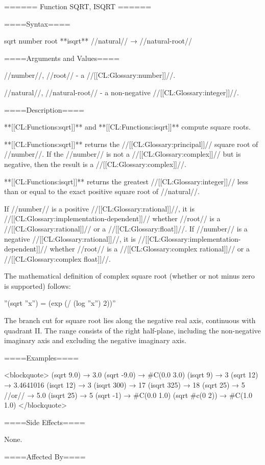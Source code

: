 ====== Function SQRT, ISQRT ======

====Syntax====

\DefunWithValues sqrt {number} {root} **isqrt** //natural// → //natural-root//

====Arguments and Values====

//number//, //root// - a //[[CL:Glossary:number]]//.

//natural//, //natural-root// - a non-negative //[[CL:Glossary:integer]]//.

====Description====

**[[CL:Functions:sqrt]]** and **[[CL:Functions:isqrt]]** compute square roots.

**[[CL:Functions:sqrt]]** returns the //[[CL:Glossary:principal]]// square root of //number//. If the //number// is not a //[[CL:Glossary:complex]]// but is negative, then the result is a //[[CL:Glossary:complex]]//.

**[[CL:Functions:isqrt]]** returns the greatest //[[CL:Glossary:integer]]// less than or equal to the exact positive square root of //natural//.

If //number// is a positive //[[CL:Glossary:rational]]//, it is //[[CL:Glossary:implementation-dependent]]// whether //root// is a //[[CL:Glossary:rational]]// or a //[[CL:Glossary:float]]//. If //number// is a negative //[[CL:Glossary:rational]]//, it is //[[CL:Glossary:implementation-dependent]]// whether //root// is a //[[CL:Glossary:complex rational]]// or a //[[CL:Glossary:complex float]]//.

The mathematical definition of complex square root (whether or not minus zero is supported) follows:

''(sqrt ''x'') = (exp (/ (log ''x'') 2))''

The branch cut for square root lies along the negative real axis, continuous with quadrant II. The range consists of the right half-plane, including the non-negative imaginary axis and excluding the negative imaginary axis.

====Examples====

<blockquote> (sqrt 9.0) → 3.0 (sqrt -9.0) → #C(0.0 3.0) (isqrt 9) → 3 (sqrt 12) → 3.4641016 (isqrt 12) → 3 (isqrt 300) → 17 (isqrt 325) → 18 (sqrt 25) → 5 //or// → 5.0 (isqrt 25) → 5 (sqrt -1) → #C(0.0 1.0) (sqrt #c(0 2)) → #C(1.0 1.0) </blockquote>

====Side Effects====

None.

====Affected By====

